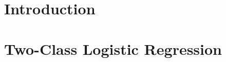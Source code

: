 \documentclass[12pt, a4 paper]{article}
\begin{document}




\section*{Introduction}
\label{sec:intro}



\section{Two-Class Logistic Regression}
\label{sec:logisticRegression}

\label{prob:1.a}
\end{document}

